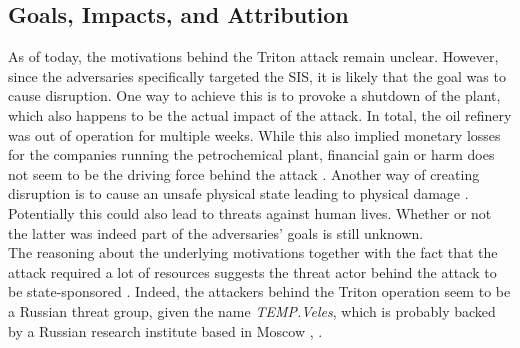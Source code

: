 \documentclass[runningheads]{llncs}
\begin{document}
\subsection{Goals, Impacts, and Attribution}
\label{subsection:triton-goals-impact-attribution}
As of today, the motivations behind the Triton attack remain unclear.
However, since the adversaries specifically targeted the SIS, it is likely that the goal was to cause disruption.
One way to achieve this is to provoke a shutdown of the plant, which also happens to be the actual impact of the attack.
In total, the oil refinery was out of operation for multiple weeks. %
While this also implied monetary losses for the companies running the petrochemical plant, financial gain or harm does not seem to be the driving force behind the attack \cite{kovacs.17}.
Another way of creating disruption is to cause an unsafe physical state leading to physical damage \cite{dragos.17}.
Potentially this could also lead to threats against human lives.
Whether or not the latter was indeed part of the adversaries' goals is still unknown.\\
The reasoning about the underlying motivations together with the fact that the attack required a lot of resources suggests the threat actor behind the attack to be state-sponsored \cite{kovacs.17}.
Indeed, the attackers behind the Triton operation seem to be a Russian threat group, given the name \textit{TEMP.Veles}, which is probably backed by a Russian research institute based in Moscow \cite{fireeye.18}, \cite{sobczak.19}.
\end{document}
